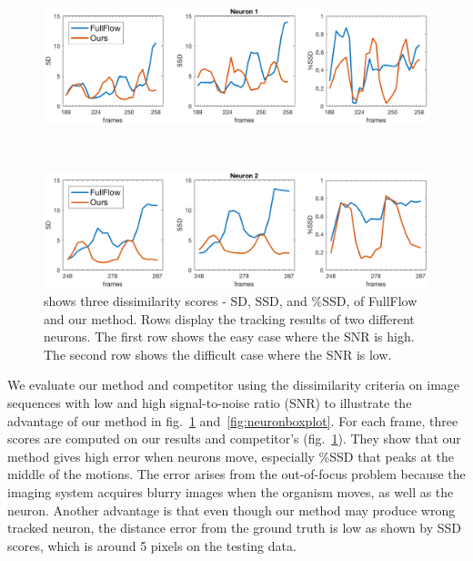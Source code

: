 \documentclass{article}
\begin{document}
\begin{figure}[tb!]
	\centering
	\begin{minipage}[b]{0.67\linewidth}
		\centerline{\includegraphics[width=\linewidth]{img/neuron1stat.png}}
	\end{minipage}\\
	\begin{minipage}[b]{0.67\linewidth}
		\centerline{\includegraphics[width=\linewidth]{img/neuron2stat.png}}
	\end{minipage}
	\vspace{-10pt}
	\caption{\small{shows three dissimilarity scores - SD, SSD, and \%SSD, of FullFlow \cite{Chen2016} and our method. Rows display the tracking results of two different neurons. The first row shows the easy case where the SNR is high. The second row shows the difficult case where the SNR is low.}}
	\label{fig:neuronstat}
	\vspace{-10pt}
\end{figure}
We evaluate our method and competitor using the dissimilarity criteria on image sequences with low and high signal-to-noise ratio (SNR) to illustrate the advantage of our method in fig.~\ref{fig:neuronstat} and~\ref{fig:neuronboxplot}. For each frame, three scores are computed on our results and competitor's (fig.~\ref{fig:neuronstat}). They show that our method gives high error when neurons move, especially \%SSD that peaks at the middle of the motions. The error arises from the out-of-focus problem because the imaging system acquires blurry images when the organism moves, as well as the neuron. Another advantage is that even though our method may produce wrong tracked neuron, the distance error from the ground truth is low as shown by SSD scores, which is around 5 pixels on the testing data.
\end{document}
